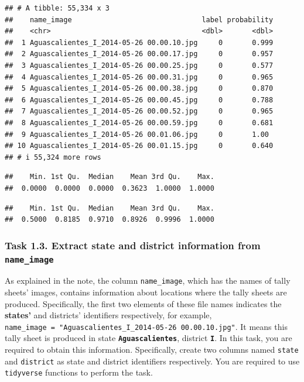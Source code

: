 \documentclass[
]{article}
\begin{document}
\begin{verbatim}
## # A tibble: 55,334 x 3
##    name_image                               label probability
##    <chr>                                    <dbl>       <dbl>
##  1 Aguascalientes_I_2014-05-26 00.00.10.jpg     0       0.999
##  2 Aguascalientes_I_2014-05-26 00.00.17.jpg     0       0.957
##  3 Aguascalientes_I_2014-05-26 00.00.25.jpg     0       0.577
##  4 Aguascalientes_I_2014-05-26 00.00.31.jpg     0       0.965
##  5 Aguascalientes_I_2014-05-26 00.00.38.jpg     0       0.870
##  6 Aguascalientes_I_2014-05-26 00.00.45.jpg     0       0.788
##  7 Aguascalientes_I_2014-05-26 00.00.52.jpg     0       0.965
##  8 Aguascalientes_I_2014-05-26 00.00.59.jpg     0       0.681
##  9 Aguascalientes_I_2014-05-26 00.01.06.jpg     0       1.00 
## 10 Aguascalientes_I_2014-05-26 00.01.15.jpg     0       0.640
## # i 55,324 more rows
\end{verbatim}

\begin{verbatim}
##    Min. 1st Qu.  Median    Mean 3rd Qu.    Max. 
##  0.0000  0.0000  0.0000  0.3623  1.0000  1.0000
\end{verbatim}

\begin{verbatim}
##    Min. 1st Qu.  Median    Mean 3rd Qu.    Max. 
##  0.5000  0.8185  0.9710  0.8926  0.9996  1.0000
\end{verbatim}

\clearpage

\hypertarget{task-1.3.-extract-state-and-district-information-from-name_image}{%
\subsubsection{\texorpdfstring{Task 1.3. Extract state and district
information from
\texttt{name\_image}}{Task 1.3. Extract state and district information from name\_image}}\label{task-1.3.-extract-state-and-district-information-from-name_image}}

As explained in the note, the column \texttt{name\_image}, which has the
names of tally sheets' images, contains information about locations
where the tally sheets are produced. Specifically, the first two
elements of these file names indicates the \textbf{states'} and
districts' identifiers respectively, for example,
\texttt{name\_image\ =\ "Aguascalientes\_I\_2014-05-26\ 00.00.10.jpg"}.
It means this tally sheet is produced in state
\textbf{\texttt{Aguascalientes}}, district \textbf{\texttt{I}}. In this
task, you are required to obtain this information. Specifically, create
two columns named \texttt{state} and \texttt{district} as state and
district identifiers respectively. You are required to use
\texttt{tidyverse} functions to perform the task.
\end{document}
